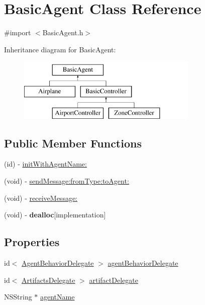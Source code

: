 \hypertarget{interface_basic_agent}{
\section{\-Basic\-Agent \-Class \-Reference}
\label{interface_basic_agent}
}


{\ttfamily \#import $<$\-Basic\-Agent.\-h$>$}

\-Inheritance diagram for \-Basic\-Agent\-:\begin{figure}[H]
\begin{center}
\leavevmode
\includegraphics[height=3.000000cm]{interface_basic_agent}
\end{center}
\end{figure}
\subsection*{\-Public \-Member \-Functions}
\begin{DoxyCompactItemize}
\item 
(id) -\/ \hyperlink{interface_basic_agent_a507fe1c35c4ecb5961dbe3f7c11133d1}{init\-With\-Agent\-Name\-:}
\item 
(void) -\/ \hyperlink{interface_basic_agent_abb32ee8123c330414a3ad0d54459b946}{send\-Message\-:from\-Type\-:to\-Agent\-:}
\item 
(void) -\/ \hyperlink{interface_basic_agent_a66e140561d343ac308020cdd99129df5}{receive\-Message\-:}
\item 
\hypertarget{interface_basic_agent_a949077cf7d4071bdd3de67f17310caa7}{
(void) -\/ {\bfseries dealloc}{\ttfamily  \mbox{[}implementation\mbox{]}}}
\label{interface_basic_agent_a949077cf7d4071bdd3de67f17310caa7}

\end{DoxyCompactItemize}
\subsection*{\-Properties}
\begin{DoxyCompactItemize}
\item 
id$<$ \hyperlink{protocol_agent_behavior_delegate-p}{\-Agent\-Behavior\-Delegate} $>$ \hyperlink{interface_basic_agent_a05f2c02931ad325b50029b55565d612d}{agent\-Behavior\-Delegate}
\item 
id$<$ \hyperlink{protocol_artifacts_delegate-p}{\-Artifacts\-Delegate} $>$ \hyperlink{interface_basic_agent_a1d96109fc3410b6b23a08296ecc44554}{artifact\-Delegate}
\item 
\-N\-S\-String $\ast$ \hyperlink{interface_basic_agent_a763a80618c57ff7402e0f19e1b077eb3}{agent\-Name}
\end{DoxyCompactItemize}


